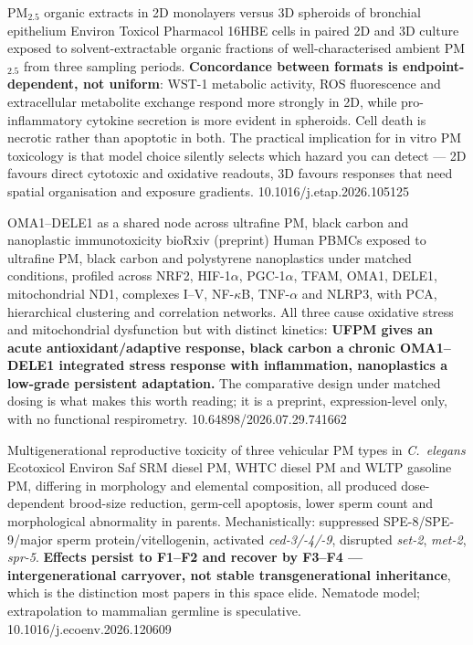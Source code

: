 \documentclass[10pt]{article}
\begin{document}

{PM$_{2.5}$ organic extracts in 2D monolayers versus 3D spheroids of bronchial epithelium}
{Environ Toxicol Pharmacol}
{16HBE cells in paired 2D and 3D culture exposed to solvent-extractable organic fractions
of well-characterised ambient PM$_{2.5}$ from three sampling periods.
\textbf{Concordance between formats is endpoint-dependent, not uniform}: WST-1 metabolic
activity, ROS fluorescence and extracellular metabolite exchange respond more strongly in
2D, while pro-inflammatory cytokine secretion is more evident in spheroids. Cell death is
necrotic rather than apoptotic in both. The practical implication for in vitro PM
toxicology is that model choice silently selects which hazard you can detect --- 2D favours
direct cytotoxic and oxidative readouts, 3D favours responses that need spatial
organisation and exposure gradients.}
{10.1016/j.etap.2026.105125}

{OMA1--DELE1 as a shared node across ultrafine PM, black carbon and nanoplastic immunotoxicity}
{bioRxiv (preprint)}
{Human PBMCs exposed to ultrafine PM, black carbon and polystyrene nanoplastics under
matched conditions, profiled across NRF2, HIF-1$\alpha$, PGC-1$\alpha$, TFAM, OMA1, DELE1,
mitochondrial ND1, complexes I--V, NF-$\kappa$B, TNF-$\alpha$ and NLRP3, with PCA,
hierarchical clustering and correlation networks. All three cause oxidative stress and
mitochondrial dysfunction but with distinct kinetics: \textbf{UFPM gives an acute
antioxidant/adaptive response, black carbon a chronic OMA1--DELE1 integrated stress
response with inflammation, nanoplastics a low-grade persistent adaptation.} The
comparative design under matched dosing is what makes this worth reading; it is a
preprint, expression-level only, with no functional respirometry.}
{10.64898/2026.07.29.741662}

{Multigenerational reproductive toxicity of three vehicular PM types in \textit{C.\ elegans}}
{Ecotoxicol Environ Saf}
{SRM diesel PM, WHTC diesel PM and WLTP gasoline PM, differing in morphology and elemental
composition, all produced dose-dependent brood-size reduction, germ-cell apoptosis, lower
sperm count and morphological abnormality in parents. Mechanistically: suppressed
SPE-8/SPE-9/major sperm protein/vitellogenin, activated \textit{ced-3/-4/-9}, disrupted
\textit{set-2}, \textit{met-2}, \textit{spr-5}. \textbf{Effects persist to F1--F2 and
recover by F3--F4 --- intergenerational carryover, not stable transgenerational
inheritance}, which is the distinction most papers in this space elide. Nematode model;
extrapolation to mammalian germline is speculative.}
{10.1016/j.ecoenv.2026.120609}
\end{document}
